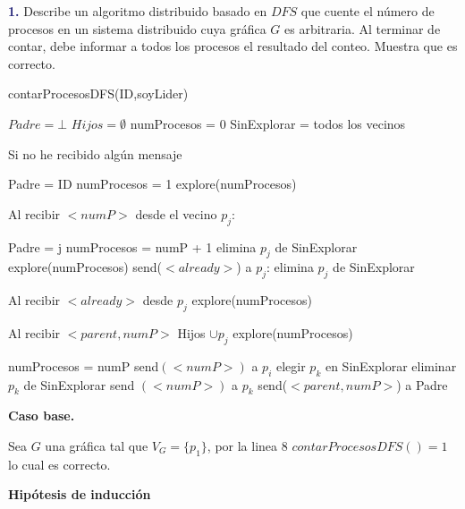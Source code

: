 \newpage
\textbf{\textcolor{MidnightBlue}{1.}}
Describe un algoritmo distribuido basado en $DFS$ que cuente el número de procesos
en un sistema distribuido cuya gráfica $G$ es arbitraria. Al terminar de contar, debe informar a todos
los procesos el resultado del conteo. Muestra que es correcto.


\begin{algorithm}
\caption{contarProcesosDFS(ID,soyLider)}
\begin{algorithmic}[1]
\State $Padre = \bot$
\State $Hijos = \emptyset$
\State numProcesos = 0
\State SinExplorar = todos los vecinos

\State Si no he recibido algún mensaje

    \State Padre = ID
    \State numProcesos = 1
    \State explore(numProcesos)
\EndIf

\State Al recibir $<numP>$ desde el vecino $p_j$:

    \State Padre = j
    \State numProcesos = numP + 1 
    \State elimina $p_j$ de SinExplorar
    \State explore(numProcesos)
\Else
    \State send($<already>$) a $p_j$:
    \State elimina $p_j$ de SinExplorar
\EndIf

\State Al recibir $<already>$ desde $p_j$
    \State explore(numProcesos)

\State Al recibir $<parent,numP>$
    \State Hijos $\cup {p_j}$
    \State explore(numProcesos)


        \State numProcesos = numP
        \State send$(<numP>)$ a $p_i$
        \EndFor
    \EndIf
        \State elegir $p_k$ en SinExplorar
        \State eliminar $p_k$ de SinExplorar
        \State send $(<numP>)$ a $p_k$
    \Else
            \State send($<parent, numP>$) a Padre
        \EndIf
    \EndIf
\EndProcedure
\end{algorithmic}
\end{algorithm}

\textbf{Caso base.} 

Sea $G$ una gráfica tal que $V_G=\{p_1\}$, por la linea 8 $contarProcesosDFS()= 1 $ lo cual es correcto.

\textbf{Hipótesis de inducción}

